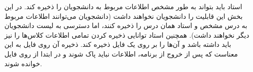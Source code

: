 استاد باید بتواند به طور مشخص اطلاعات مربوط به دانشجویان را ذخیره کند.  
در این بخش این قابلیت را دانشجویان نخواهند داشت (دانشجویان می‌توانند اطلاعات مربوط به درس مشخص و استاد همان درس را ذخیره کنند، اما دسترسی به لیست دانشجویان دیگر نخواهند داشت).  
همچنین استاد توانایی ذخیره کردن تمامی اطلاعات کلاس‌ها را نیز باید داشته باشد و آن‌ها را بر روی یک فایل ذخیره کند. ذخیره آن روی فایل به این معناست که پس از خروج از برنامه، اطلاعات نباید پاک شوند و در ابتدا از روی فایل خوانده شوند.